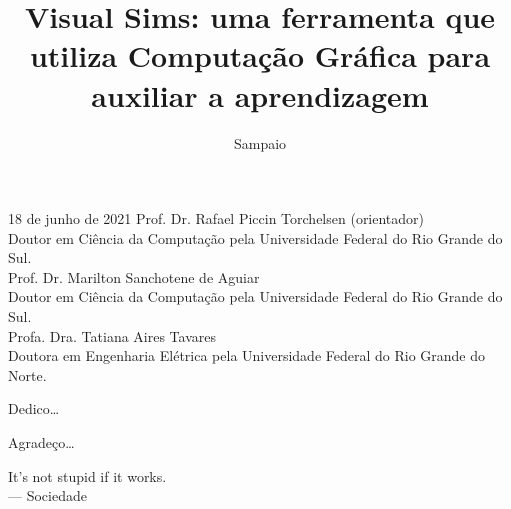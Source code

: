 \documentclass[tcc,capa]{texufpel}
\title{Visual Sims: uma ferramenta que utiliza Computação Gráfica para auxiliar a aprendizagem}
\author{Sampaio}{Letícia}
\begin{document}

\maketitle 

\sloppy

\fichacatalografica


\begin{aprovacao}{18 de junho de 2021} %
\noindent Prof. Dr. Rafael Piccin Torchelsen (orientador)\\
Doutor em Ciência da Computação pela Universidade Federal do Rio Grande do Sul.\\[1cm]

\noindent Prof. Dr. Marilton Sanchotene de Aguiar\\
Doutor em Ciência da Computação pela Universidade Federal do Rio Grande do Sul.\\[1cm]

\noindent Profa. Dra. Tatiana Aires Tavares\\
Doutora em Engenharia Elétrica pela Universidade Federal do Rio Grande do Norte.\\[1cm]

\end{aprovacao}

\begin{dedicatoria}
  Dedico\ldots 
\end{dedicatoria}

\begin{agradecimentos}
  Agradeço\ldots 
\end{agradecimentos}

\begin{epigrafe}
  It's not stupid if it works.\\
  {\sc --- Sociedade}
\end{epigrafe}
\end{document}
